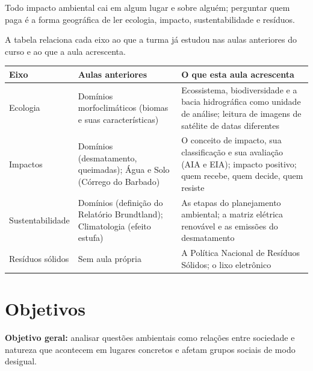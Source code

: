 \documentclass[11pt]{article}
\begin{document}
\begin{destaque}[title={Tese da aula}]
Todo impacto ambiental cai em algum lugar e sobre alguém; perguntar quem paga é a forma geográfica de ler
ecologia, impacto, sustentabilidade e resíduos.
\end{destaque}

A tabela relaciona cada eixo ao que a turma já estudou nas aulas anteriores do curso e ao que a aula acrescenta.

\begin{small}
\begin{tabularx}{\linewidth}{@{}>{\raggedright\arraybackslash}p{3.0cm}>{\raggedright\arraybackslash}p{4.2cm}X@{}}
\toprule
\textsf{\bfseries Eixo} & \textsf{\bfseries Aulas anteriores} & \textsf{\bfseries O que esta aula acrescenta} \\\midrule
Ecologia & Domínios morfoclimáticos (biomas e suas características) & Ecossistema, biodiversidade e a bacia hidrográfica como unidade de análise; leitura de imagens de satélite de datas diferentes \\
Impactos & Domínios (desmatamento, queimadas); Água e Solo (Córrego do Barbado) & O conceito de impacto, sua classificação e sua avaliação (AIA e EIA); impacto positivo; quem recebe, quem decide, quem resiste \\
Sustentabilidade & Domínios (definição do Relatório Brundtland); Climatologia (efeito estufa) & As etapas do planejamento ambiental; a matriz elétrica renovável e as emissões do desmatamento \\
Resíduos sólidos & Sem aula própria & A Política Nacional de Resíduos Sólidos; o lixo eletrônico \\
\bottomrule
\end{tabularx}
\end{small}

\section{Objetivos}
\textbf{Objetivo geral:} analisar questões ambientais como relações entre sociedade e natureza que acontecem em
lugares concretos e afetam grupos sociais de modo desigual.
\end{document}
